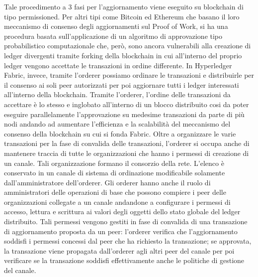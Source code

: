 Tale procedimento a 3 fasi per l'aggiornamento viene eseguito su blockchain di tipo permissioned. Per altri tipi come Bitcoin ed Ethereum che basano il loro meccanismo di consenso degli aggiornamenti sul Proof of Work, si ha una procedura basata sull'applicazione di un algoritmo di approvazione tipo probabilistico computazionale che, però, sono ancora vulnerabili alla creazione di ledger divergenti tramite forking della blockchain in cui all'interno del proprio ledger vengono accettate le transazioni in ordine differente. In Hyperledger Fabric, invece, tramite l'orderer possiamo ordinare le transazioni e distribuirle per il consenso ai soli peer autorizzati per poi aggiornare tutti i ledger interessati all'interno della blockchain. Tramite l'orderer, l'ordine delle transazioni da accettare è lo stesso e inglobato all'interno di un blocco distribuito cosi da poter eseguire parallelamente l'approvazione su medesime transazioni da parte di più nodi andando ad aumentare l'efficienza e la scalabilità del meccanismo del consenso della blockchain su cui si fonda Fabric. Oltre a organizzare le varie transazioni per la fase di convalida delle transazioni, l'orderer si occupa anche di mantenere traccia di tutte le organizzazioni che hanno i permessi di creazione di un canale. Tali organizzazione formano il consorzio della rete. L'elenco è conservato in un canale di sistema di ordinazione modificabile solamente dall'amministratore dell'orderer. Gli orderer hanno anche il ruolo di amministratori delle operazioni di base che possono compiere i peer delle organizzazioni collegate a un canale andandone a configurare i permessi di accesso, lettura e scrittura ai valori degli oggetti dello stato globale del ledger distribuito. Tali permessi vengono gestiti in fase di convalida di una transazione di aggiornamento proposta da un peer: l'orderer verifica che l'aggiornamento soddisfi i permessi concessi dal peer che ha richiesto la transazione; se approvata, la transazione viene propagata dall'orderer agli altri peer del canale per poi verificare se la transazione soddisfi effettivamente anche le politiche di gestione del canale.
